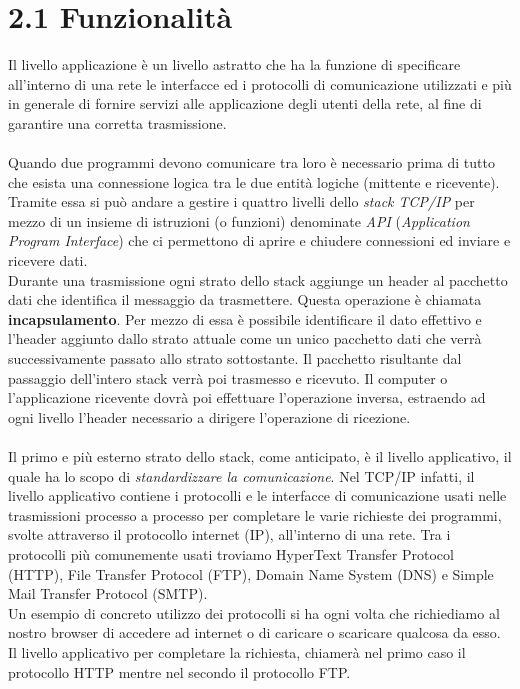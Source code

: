\documentclass[a4paper, 11pt, oneside]{book}
\theoremstyle{plain}
\begin{document}
\section*{2.1 Funzionalità}
Il livello applicazione è un livello astratto che ha la funzione di specificare all'interno di una rete le interfacce ed i protocolli di comunicazione utilizzati e più in generale di fornire servizi alle applicazione degli utenti della rete, al fine di garantire una corretta trasmissione.\\\\
Quando due programmi devono comunicare tra loro è necessario prima di tutto che esista una connessione logica tra le due entità logiche (mittente e ricevente). Tramite essa si può andare a gestire i quattro livelli dello \textit{stack TCP/IP} per mezzo di un insieme di istruzioni (o funzioni) denominate \textit{API} (\textit{Application Program Interface}) che ci permettono di aprire e chiudere connessioni ed inviare e ricevere dati. \\Durante una trasmissione ogni strato dello stack aggiunge un header al pacchetto dati che identifica il messaggio da trasmettere. Questa operazione è chiamata \textbf{incapsulamento}. Per mezzo di essa è possibile identificare il dato effettivo e l'header aggiunto dallo strato attuale come un unico pacchetto dati che verrà successivamente passato allo strato sottostante. Il pacchetto risultante dal passaggio dell'intero stack verrà poi trasmesso e ricevuto. Il computer o l'applicazione ricevente dovrà poi effettuare l'operazione inversa, estraendo ad ogni livello l'header necessario a dirigere l'operazione di ricezione.
\\\\Il primo e più esterno strato dello stack, come anticipato, è il livello applicativo, il quale ha lo scopo di \textit{standardizzare la comunicazione}. Nel TCP/IP infatti, il livello applicativo contiene i protocolli e le interfacce di comunicazione usati nelle trasmissioni processo a processo per completare le varie richieste dei programmi, svolte attraverso il protocollo internet (IP), all'interno di una rete. Tra i protocolli più comunemente usati troviamo HyperText Transfer Protocol (HTTP), File Transfer Protocol (FTP), Domain Name System (DNS) e Simple Mail Transfer Protocol (SMTP).\\
Un esempio di concreto utilizzo dei protocolli si ha ogni volta che richiediamo al nostro browser di accedere ad internet o di caricare o scaricare qualcosa da esso. Il livello applicativo per completare la richiesta, chiamerà nel primo caso il protocollo HTTP mentre nel secondo il protocollo FTP.\\
\end{document}

